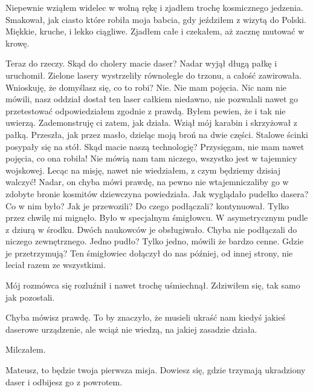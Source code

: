 Niepewnie wziąłem widelec w wolną rękę i zjadłem trochę kosmicznego jedzenia.
Smakował, jak ciasto które robiła moja babcia, gdy jeździłem z wizytą do Polski.
Miękkie, kruche, i lekko ciągliwe.
Zjadłem całe i czekałem, aż zacznę mutować w krowę.

\begin{dialogue}
\ds{} Teraz do rzeczy. Skąd do cholery macie daser? \dm{} Nadar wyjął długą pałkę i uruchomił. Zielone lasery wystrzeliły równolegle do trzonu, a całość zawirowała.
\dm{} Wnioskuję, że domyślasz się, co to robi?
\ds{} Nie. Nie mam pojęcia. Nic nam nie mówili, nasz oddział dostał ten laser całkiem niedawno, nie pozwalali nawet go przetestować \dm{} odpowiedziałem zgodnie z prawdą. 
Byłem pewien, że i tak nie uwierzą.
\ds{} Zademonstruję ci zatem, jak działa. \dm{} Wziął mój karabin i skrzyżował z pałką. 
Przeszła, jak przez masło, dzieląc moją broń na dwie części. Stalowe ścinki posypały się na stół. \dm{} Skąd macie naszą technologię?
\ds{} Przysięgam, nie mam nawet pojęcia, co ona robiła! Nie mówią nam tam niczego, wszystko jest w tajemnicy wojskowej. 
Lecąc na misję, nawet nie wiedziałem, z czym będziemy dzisiaj walczyć!
\ds{} Nadar, on chyba mówi prawdę, na pewno nie wtajemniczaliby go w zdobyte bronie kosmitów \dm{} dziewczyna powiedziała.
\ds{} Jak wyglądało pudełko dasera? Co w nim było? Jak je przewozili? Do czego podłączali? \dm{} kontynuował.
\ds{} Tylko przez chwilę mi mignęło. Było w specjalnym śmigłowcu. W asymetrycznym pudle z dziurą w środku. Dwóch naukowców je obsługiwało. Chyba nie podłączali do niczego zewnętrznego.
\ds{} Jedno pudło?
\ds{} Tylko jedno, mówili że bardzo cenne.
\ds{} Gdzie je przetrzymują?
\ds{} Ten śmigłowiec dołączył do nas później, od innej strony, nie leciał razem ze wszystkimi.
\end{dialogue}

Mój rozmówca się rozluźnił i nawet trochę uśmiechnął.
Zdziwiłem się, tak samo jak pozostali.

\begin{dialogue}
\ds{} Chyba mówisz prawdę. To by znaczyło, że musieli ukraść nam kiedyś jakieś daserowe urządzenie, ale wciąż nie wiedzą, na jakiej zasadzie działa.
\end{dialogue}

Milczałem.

\begin{dialogue}
\ds{} Mateusz, to będzie twoja pierwsza misja. Dowiesz się, gdzie trzymają ukradziony daser i odbijesz go z powrotem. 
\end{dialogue}


